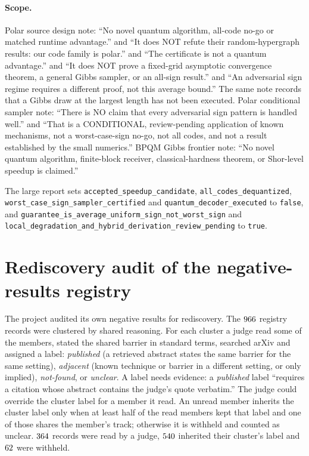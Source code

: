 \documentclass[10pt]{article}
\begin{document}
\paragraph{Scope.} Polar source design note: ``No novel quantum algorithm, all-code no-go or matched runtime advantage.'' and ``It does NOT refute their random-hypergraph results: our code family is polar.'' and ``The certificate is not a quantum advantage.'' and ``It does NOT prove a fixed-grid asymptotic convergence theorem, a general Gibbs sampler, or an all-sign result.'' and ``An adversarial sign regime requires a different proof, not this average bound.'' The same note records that a Gibbs draw at the largest length has not been executed. Polar conditional sampler note: ``There is NO claim that every adversarial sign pattern is handled well.'' and ``That is a CONDITIONAL, review-pending application of known mechanisms, not a worst-case-sign no-go, not all codes, and not a result established by the small numerics.'' BPQM Gibbs frontier note: ``No novel quantum algorithm, finite-block receiver, classical-hardness theorem, or Shor-level speedup is claimed.''
\begin{flushleft}
The large report sets \texttt{accepted\_speedup\_candidate}, \texttt{all\_codes\_dequantized}, \texttt{worst\_case\_sign\_sampler\_certified} and \texttt{quantum\_decoder\_executed} to \texttt{false}, and \texttt{guarantee\_is\_average\_uniform\_sign\_not\_worst\_sign} and \texttt{local\_degradation\_and\_hybrid\_derivation\_review\_pending} to \texttt{true}.
\end{flushleft}

\section{Rediscovery audit of the negative-results registry}
\label{sec:lit}

The project audited its own negative results for rediscovery. The $966$ registry records were clustered by shared reasoning. For each cluster a judge read some of the members, stated the shared barrier in standard terms, searched arXiv and assigned a label: \emph{published} (a retrieved abstract states the same barrier for the same setting), \emph{adjacent} (known technique or barrier in a different setting, or only implied), \emph{not-found}, or \emph{unclear}. A label needs evidence: a \emph{published} label ``requires a citation whose abstract contains the judge's quote verbatim.'' The judge could override the cluster label for a member it read. An unread member inherits the cluster label only when at least half of the read members kept that label and one of those shares the member's track; otherwise it is withheld and counted as unclear. $364$ records were read by a judge, $540$ inherited their cluster's label and $62$ were withheld.
\end{document}
